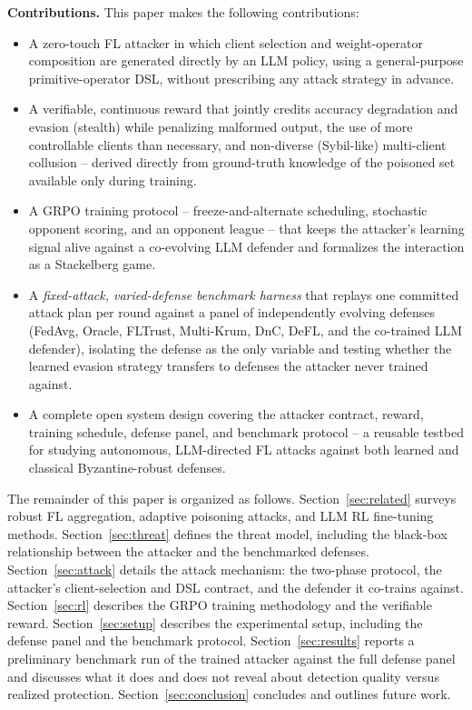 \documentclass[conference]{IEEEtran}
\begin{document}
\textbf{Contributions.} This paper makes the following contributions:
\begin{itemize}
    \item A zero-touch FL attacker in which client selection and weight-operator composition are generated directly by an LLM policy, using a general-purpose primitive-operator DSL, without prescribing any attack strategy in advance.
    \item A verifiable, continuous reward that jointly credits accuracy degradation and evasion (stealth) while penalizing malformed output, the use of more controllable clients than necessary, and non-diverse (Sybil-like) multi-client collusion -- derived directly from ground-truth knowledge of the poisoned set available only during training.
    \item A GRPO training protocol -- freeze-and-alternate scheduling, stochastic opponent scoring, and an opponent league -- that keeps the attacker's learning signal alive against a co-evolving LLM defender and formalizes the interaction as a Stackelberg game.
    \item A \emph{fixed-attack, varied-defense benchmark harness} that replays one committed attack plan per round against a panel of independently evolving defenses (FedAvg, Oracle, FLTrust, Multi-Krum, DnC, DeFL, and the co-trained LLM defender), isolating the defense as the only variable and testing whether the learned evasion strategy transfers to defenses the attacker never trained against.
    \item A complete open system design covering the attacker contract, reward, training schedule, defense panel, and benchmark protocol -- a reusable testbed for studying autonomous, LLM-directed FL attacks against both learned and classical Byzantine-robust defenses.
\end{itemize}

The remainder of this paper is organized as follows. Section~\ref{sec:related} surveys robust FL aggregation, adaptive poisoning attacks, and LLM RL fine-tuning methods. Section~\ref{sec:threat} defines the threat model, including the black-box relationship between the attacker and the benchmarked defenses. Section~\ref{sec:attack} details the attack mechanism: the two-phase protocol, the attacker's client-selection and DSL contract, and the defender it co-trains against. Section~\ref{sec:rl} describes the GRPO training methodology and the verifiable reward. Section~\ref{sec:setup} describes the experimental setup, including the defense panel and the benchmark protocol. Section~\ref{sec:results} reports a preliminary benchmark run of the trained attacker against the full defense panel and discusses what it does and does not reveal about detection quality versus realized protection. Section~\ref{sec:conclusion} concludes and outlines future work.
\end{document}
